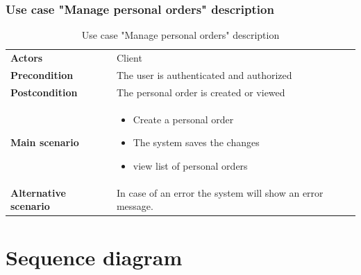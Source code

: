 \documentclass[12pt,a4paper]{report}
\begin{document}
		\subsubsection*{Use case "Manage personal orders" description}
		\begin{table}[H]
			\begin{center}
				\captionsetup[table]{skip=10pt}
				\caption{Use case "Manage personal orders" description}
				\setlength\doublerulesep{0.5pt}
				\begin{tabular}{|  p{5cm}|  p{9cm}|}
					\rowcolor{LightCyan}
					
					\hline
					\multicolumn{2}{c}{Use case "Manage personal orders"}\\
					\hline
					
					\textbf{Actors} &                        
					Client 
					\\ \hline
					
					\textbf{Precondition} &                        
					The user is authenticated and authorized
					\\ \hline
					\textbf{Postcondition} &                        
					The personal order is created or viewed
					\\ \hline
					
					\textbf{Main scenario} &                   
					\begin{itemize}
						\item Create a personal order
						\item The system saves the changes
						\item view list of personal orders
						
					\end{itemize}
					
					
					\\ \hline
					
					\textbf{Alternative scenario} &                        
					In case of an error the system will show an error message.
					\\ \hline
					
					
				\end{tabular}
				
			\end{center}
			
		\end{table}
\section{Sequence diagram}
\end{document}
